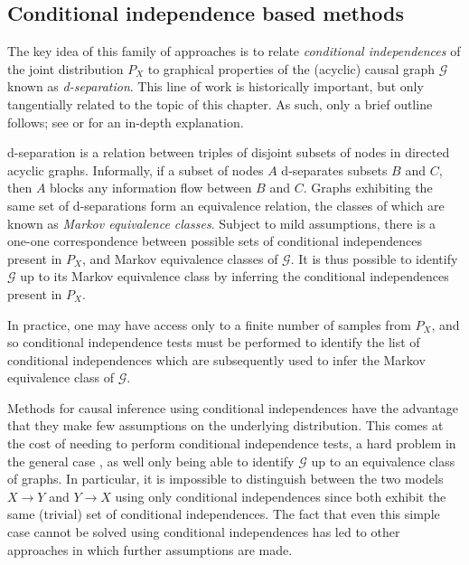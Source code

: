 \subsection{Conditional independence based methods}

The key idea of this family of approaches is to relate \emph{conditional independences} of the joint distribution $P_X$ to graphical properties of the (acyclic) causal graph $\mathcal{G}$ known as \emph{d-separation}.
This line of work is historically important, but only tangentially related to the topic of this chapter.
As such, only a brief outline follows; see \cite{pearl2009causality} or \cite{peters2017elements} for an in-depth explanation.

d-separation is a relation between triples of disjoint subsets of nodes in directed acyclic graphs. 
Informally, if a subset of nodes $A$ d-separates subsets $B$ and $C$, then $A$ blocks any information flow between $B$ and $C$. 
Graphs exhibiting the same set of d-separations form an equivalence relation, the classes of which are known as \emph{Markov equivalence classes}.
Subject to mild assumptions, there is a one-one correspondence between possible sets of conditional independences present in $P_X$, and Markov equivalence classes of $\mathcal{G}$. 
It is thus possible to identify $\mathcal{G}$ up to its Markov equivalence class by inferring the conditional independences present in $P_X$.

In practice, one may have access only to a finite number of samples from $P_X$, and so conditional independence tests must be performed to identify the list of conditional independences which are subsequently used to infer the Markov equivalence class of $\mathcal{G}$.

Methods for causal inference using conditional independences have the advantage that they make few assumptions on the underlying distribution.
This comes at the cost of needing to perform conditional independence tests, a hard problem in the general case \citep{shah2018hardness}, as well only being able to identify $\mathcal{G}$ up to an equivalence class of graphs. 
In particular, it is impossible to distinguish between the two models $X \to Y$ and $Y \to X$ using only conditional independences since both exhibit the same (trivial) set of conditional independences.
The fact that even this simple case cannot be solved using conditional independences has led to other approaches in which further assumptions are made.

